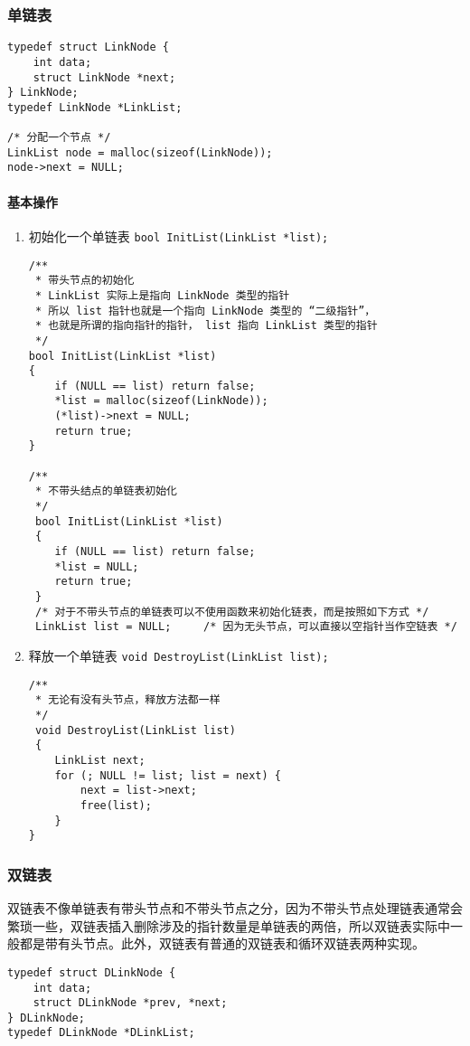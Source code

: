 \documentclass{ctexart}
\begin{document}
\subsubsection{单链表}
\begin{verbatim}
typedef struct LinkNode {
    int data;
    struct LinkNode *next;
} LinkNode;
typedef LinkNode *LinkList;

/* 分配一个节点 */
LinkList node = malloc(sizeof(LinkNode));
node->next = NULL;
\end{verbatim}

\paragraph{基本操作}
\begin{enumerate}
\item 初始化一个单链表 \texttt{bool InitList(LinkList *list);}
\begin{verbatim}
/**
 * 带头节点的初始化
 * LinkList 实际上是指向 LinkNode 类型的指针
 * 所以 list 指针也就是一个指向 LinkNode 类型的 “二级指针”，
 * 也就是所谓的指向指针的指针， list 指向 LinkList 类型的指针
 */
bool InitList(LinkList *list)
{
    if (NULL == list) return false;
    *list = malloc(sizeof(LinkNode));
    (*list)->next = NULL;
    return true;
}

/**
 * 不带头结点的单链表初始化
 */
 bool InitList(LinkList *list)
 {
    if (NULL == list) return false;
    *list = NULL;
    return true;
 }
 /* 对于不带头节点的单链表可以不使用函数来初始化链表，而是按照如下方式 */
 LinkList list = NULL;     /* 因为无头节点，可以直接以空指针当作空链表 */
\end{verbatim}

\item 释放一个单链表 \texttt{void DestroyList(LinkList list);}
\begin{verbatim}
/**
 * 无论有没有头节点，释放方法都一样
 */
 void DestroyList(LinkList list)
 {
    LinkList next;
    for (; NULL != list; list = next) {
        next = list->next;
        free(list);
    }
}
\end{verbatim}

\end{enumerate}

\subsubsection{双链表}
双链表不像单链表有带头节点和不带头节点之分，因为不带头节点处理链表通常会繁琐一些，双链表插入删除涉及的指针数量是单链表的两倍，所以双链表实际中一般都是带有头节点。此外，双链表有普通的双链表和循环双链表两种实现。
\begin{verbatim}
typedef struct DLinkNode {
    int data;
    struct DLinkNode *prev, *next;
} DLinkNode;
typedef DLinkNode *DLinkList;
\end{verbatim}
\end{document}
